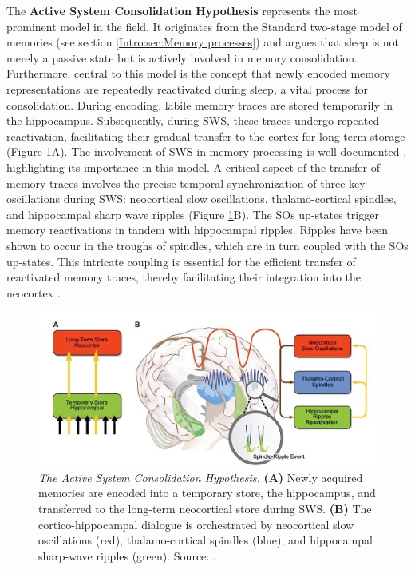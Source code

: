 The \textbf{Active System Consolidation Hypothesis} \parencite[ASC,][Figure \ref{fig:ASC}]{diekelmann_memory_2010,rasch_about_2013} represents the most prominent model in the field. It originates from the Standard two-stage model of memories (see section \ref{Intro:sec:Memory processes}) and argues that sleep is not merely a passive state but is actively involved in memory consolidation. Furthermore, central to this model is the concept that newly encoded memory representations are repeatedly reactivated during sleep, a vital process for consolidation. During encoding, labile memory traces are stored temporarily in the hippocampus. Subsequently, during SWS, these traces undergo repeated reactivation, facilitating their gradual transfer to the cortex for long-term storage (Figure \ref{fig:ASC}A). The involvement of SWS in memory processing is well-documented \parencite{diekelmann_memory_2010, walker_role_2009, rasch_about_2013}, highlighting its importance in this model.
A critical aspect of the transfer of memory traces involves the precise temporal synchronization of three key oscillations during SWS: neocortical slow oscillations, thalamo-cortical spindles, and hippocampal sharp wave ripples (Figure \ref{fig:ASC}B). The SOs up-states trigger memory reactivations in tandem with hippocampal ripples. Ripples have been shown to occur in the troughs of spindles, which are in turn coupled with the SOs up-states. This intricate coupling is essential for the efficient transfer of reactivated memory traces, thereby facilitating their integration into the neocortex \parencite{rasch_about_2013}. 

\FloatBarrier
\begin{figure}
    \centering
    \includegraphics[width=0.9\linewidth]{1_Introduction//IntroImages/Picture4-K7_mBWyR6-transformed.jpeg}
    \caption[\textit{The Active System Consolidation Hypothesis}]{\textit{The Active System Consolidation Hypothesis.} \textbf{(A)} Newly acquired memories are encoded into a temporary store, the hippocampus, and transferred to the long-term neocortical store during SWS. \textbf{(B)} The cortico-hippocampal dialogue is orchestrated by neocortical slow oscillations (red), thalamo-cortical spindles (blue), and hippocampal sharp-wave ripples (green). Source: \cite{rasch_about_2013}. \vspace{1cm}}
    \label{fig:ASC}
\end{figure}
\FloatBarrier

